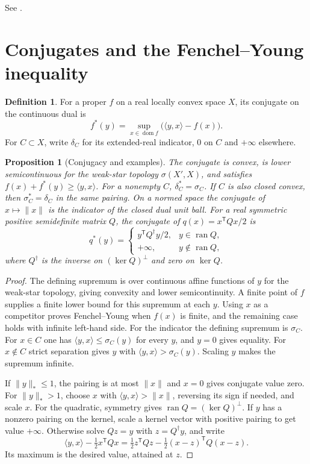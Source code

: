 \documentclass[11pt,oneside,openany]{book}
\theoremstyle{plain}
\newtheorem{proposition}[theorem]{Proposition}
\theoremstyle{definition}
\newtheorem{definition}[theorem]{Definition}
\theoremstyle{remark}
\begin{document}
See \cite[Theorem 3.7 and Corollary 3.9]{Brezis}.

\section{Conjugates and the Fenchel--Young inequality}\label{v02-04}

\begin{definition}
For a proper \(f\) on a real locally convex space \(X\), its
conjugate on the continuous dual is
\[
 f^*(y)=\sup_{x\in\operatorname{dom}f}
             \bigl(\langle y,x\rangle-f(x)\bigr).
\]
For \(C\subset X\), write \(\delta_C\) for its extended-real
indicator, \(0\) on \(C\) and \(+\infty\) elsewhere.
\end{definition}

\begin{proposition}[Conjugacy and examples]\label{prop:conjugate-basic}
The conjugate is convex, is lower semicontinuous for the weak-star
topology \(\sigma(X',X)\), and satisfies
\(f(x)+f^*(y)\ge\langle y,x\rangle\).
For a nonempty \(C\), \(\delta_C^*=\sigma_C\).
If \(C\) is also closed convex, then \(\sigma_C^*=\delta_C\) in the
same pairing. On a normed space the conjugate of \(x\mapsto\lVert
x\rVert\) is the indicator of the closed dual unit ball.
For a real symmetric positive semidefinite matrix \(Q\), the
conjugate of \(q(x)=x^{\mathsf T}Qx/2\) is
\[
 q^*(y)=
 \begin{cases}
  y^{\mathsf T}Q^\dagger y/2,& y\in\operatorname{ran}Q,\\
  +\infty,&y\notin\operatorname{ran}Q,
 \end{cases}
\]
where \(Q^\dagger\) is the inverse on \((\ker Q)^\perp\) and
zero on \(\ker Q\).
\end{proposition}

\begin{proof}
The defining supremum is over continuous affine functions of
\(y\) for the weak-star topology, giving convexity and lower
semicontinuity. A finite point of \(f\) supplies a finite
lower bound for this supremum at each \(y\). Using \(x\) as a
competitor proves Fenchel--Young when \(f(x)\) is finite, and
the remaining case holds with infinite left-hand side.
For the indicator the defining supremum is \(\sigma_C\).
For \(x\in C\) one has
\(\langle y,x\rangle\le\sigma_C(y)\) for every \(y\), and
\(y=0\) gives equality. For \(x\notin C\) strict separation
gives \(y\) with \(\langle y,x\rangle>\sigma_C(y)\).
Scaling \(y\) makes the supremum infinite.

If \(\lVert y\rVert_*\le1\), the pairing is at most
\(\lVert x\rVert\) and \(x=0\) gives conjugate value zero.
For \(\lVert y\rVert_*>1\), choose \(x\) with
\(\langle y,x\rangle>\lVert x\rVert\), reversing its sign if
needed, and scale \(x\).
For the quadratic, symmetry gives
\(\operatorname{ran}Q=(\ker Q)^\perp\). If \(y\) has a
nonzero pairing on the kernel, scale a kernel vector with
positive pairing to get value \(+\infty\). Otherwise solve
\(Qz=y\) with \(z=Q^\dagger y\), and write
\[
 \langle y,x\rangle-\tfrac12x^{\mathsf T}Qx
 =\tfrac12z^{\mathsf T}Qz-\tfrac12(x-z)^{\mathsf T}Q(x-z).
\]
Its maximum is the desired value, attained at \(z\).
\end{proof}
\end{document}
